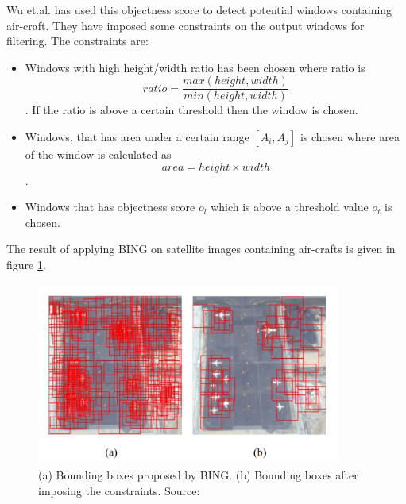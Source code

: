 \par Wu et.al. \cite{b5} has used this objectness score to detect potential windows containing air-craft. They have imposed some constraints on the output windows for filtering. The constraints are: 
\begin{itemize}
    \item Windows with high height/width ratio has been chosen where ratio is $$ratio=\frac{max(height, width)}{min(height,width)}$$. If the ratio is above a certain threshold then the window is chosen.
    
    \item Windows, that has area under a certain range $[A_i,A_j]$ is chosen where area of the window is calculated as $$area=height\times width$$.
    
    \item Windows that has objectness score $o_l$ which is above a threshold  value $o_t$ is chosen.
\end{itemize}
\par The result of applying BING on satellite images containing air-crafts is given in figure \ref{fig5}.

\begin{figure}[!htbp]
\centerline{\includegraphics[height=60mm,width=100mm]{img/fig5.png}}
\caption{(a) Bounding boxes proposed by BING. (b) Bounding boxes after imposing the constraints. Source: \cite{b5}}
\label{fig5}
\end{figure}
